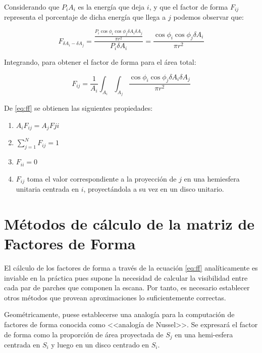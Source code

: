 Considerando que ${P}_{i}{A_{i}}$ es la energía que deja $i$, y que el factor de forma $F_{ij}$ representa el porcentaje de dicha energía que llega a $j$ podemos observar que:

\begin{equation}
    F_{\delta{A_{i}}-\delta{A_{j}}} = \frac{\frac{P_{i}\cos{\phi_{i}}\cos{\phi_{j}}\delta{A_{i}}\delta{A_{j}}}{\pi r^{2}}}{P_{i}\delta{A_{i}}} = \frac{\cos{\phi_{i}}\cos{\phi_{j}}\delta{A_{i}}}{\pi{r^{2}}}
\end{equation}

Integrando, para obtener el factor de forma para el área total:

\begin{equation}
    F_{ij} = \frac{1}{A_{i}} \int_{A_{i}}\int_{A_{j}}\frac{\cos{\phi_{i}}\cos{\phi_{j}}\delta{A_{i}}\delta{A_{j}}}{\pi{r^{2}}} \label{eq:ff}    
\end{equation}

De \eqref{eq:ff} se obtienen las siguientes propiedades:
\begin{enumerate}
	\label{propsff}
    \item $A_{i}F_{ij} = A_{j}F{ji}$
    \item $\sum_{j=1}^{N} F_{ij} = 1$
    \item $F_{ii} = 0$
    \item $F_{ij}$ toma el valor correspondiente a la proyección de $j$ en una hemiesfera unitaria centrada en $i$, proyectándola a su vez en un disco unitario.
\end{enumerate}


\section{Métodos de cálculo de la matriz de Factores de Forma}
\label{sec:calculoff}

El cálculo de los factores de forma a través de la ecuación \eqref{eq:ff} analíticamente es inviable en la práctica pues supone la necesidad de calcular la visibilidad entre cada par de parches que componen la escana. Por tanto, es necesario establecer otros métodos que provean aproximaciones lo suficientemente correctas.

Geométricamente, puese establecerse una analogía para la computación de factores de forma conocida como <<analogía de Nussel>>. Se expresará el factor de forma como la proporción de área proyectada de $S_{j}$ en una hemi-esfera centrada en $S_{i}$ y luego en un disco centrado en $S_{i}$.

